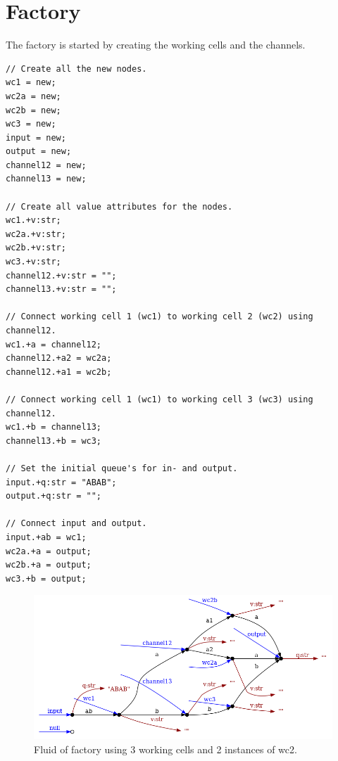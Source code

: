 \documentclass[a4paper,12px]{article}
\begin{document}
\newcommand{\Sum}[2]{\sum^{#2}_{#1}}
\newcommand{\E}[1]{{\mathbb{E}\left[#1\right]}}
\newcommand{\var}[1]{{\text{var}\left[#1\right]}}
\newcommand{\diffpart}[1]{\frac{\partial}{\partial{} #1}}
\newcommand{\?}{\stackrel{?}{=}}
\newcommand{\intinf}{\int\limits_{-\infty}^{\infty}}
\newcommand{\intnulinf}{\int\limits_{0}^{\infty}}
\newcommand{\intpi}{\int\limits_{0}^{2\pi}}
\newcommand{\argmin}[1]{\underset{#1}{\mathop{\mathrm{argmin}}}}
\newcommand{\argmax}[1]{\underset{#1}{\mathop{\mathrm{argmax}}}}


\section{Factory}

The factory is started by creating the working cells and the channels.

\begin{verbatim}
// Create all the new nodes.
wc1 = new;
wc2a = new;
wc2b = new;
wc3 = new;
input = new;
output = new;
channel12 = new;
channel13 = new;

// Create all value attributes for the nodes.
wc1.+v:str;
wc2a.+v:str;
wc2b.+v:str;
wc3.+v:str;
channel12.+v:str = "";
channel13.+v:str = "";

// Connect working cell 1 (wc1) to working cell 2 (wc2) using channel12.
wc1.+a = channel12;
channel12.+a2 = wc2a;
channel12.+a1 = wc2b;

// Connect working cell 1 (wc1) to working cell 3 (wc3) using channel12.
wc1.+b = channel13;
channel13.+b = wc3;

// Set the initial queue's for in- and output.
input.+q:str = "ABAB";
output.+q:str = "";

// Connect input and output.
input.+ab = wc1;
wc2a.+a = output;
wc2b.+a = output;
wc3.+b = output;
\end{verbatim}

\begin{figure}[h]
    \centering
    \includegraphics[width=0.8\linewidth]{factory.png}
    \caption{Fluid of factory using 3 working cells and 2 instances of wc2.}
    \label{fig:factory}
\end{figure}
\FloatBarrier%
\end{document}
